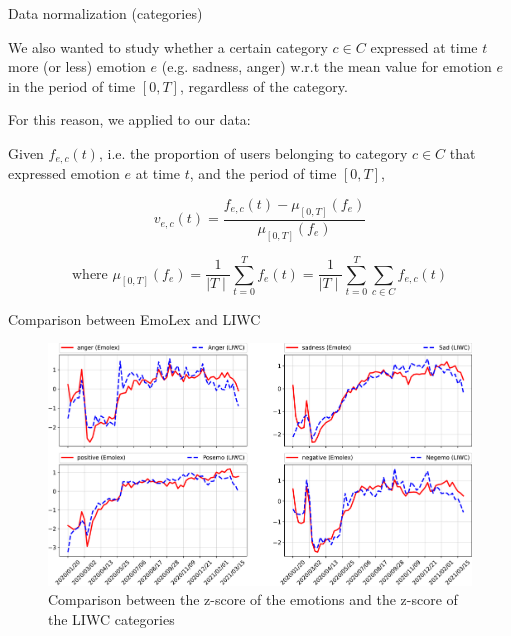 \documentclass[9pt,aspectratio=1610]{beamer}  %
\begin{document}
\begin{frame}{Data normalization (categories)}
	
	We also wanted to study whether a certain category \(c \in C\) expressed at time \(t\) more (or less) emotion \(e\) (e.g. sadness, anger) w.r.t the mean value for emotion \(e\) in the period of time \([0, T]\), regardless of the category.

    For this reason, we applied  to our data:
    	
    \begin{definition}[5]
    \label{def:categories-normalization}
    	Given \(f_{e, c}(t)\), i.e. the proportion of users belonging to category \(c \in C\) that expressed emotion \(e\) at time \(t\), and the period of time \([0,T]\),
    	
    	\[v_{e, c}(t) = \frac{f_{e, c}(t) - \mu_{[0,T]}(f_e)}{\mu_{[0,T]}(f_e)}\]
    	
    	\[\text{where } \mu_{[0,T]}(f_e) = \frac{1}{\mid T \mid} \sum_{t =0}^{T} f_e(t) = \frac{1}{\mid T \mid} \sum_{t =0}^{T} \sum_{c \in C} f_{e, c}(t)\] 
    \end{definition}
	
\end{frame}

\begin{frame}{Comparison between EmoLex and LIWC}

    \begin{figure}[H]
	    \centering
    	\includegraphics[scale=.30]{assets/img/en_emotions_and_liwc_categories_comparison.svg.pdf}
    	\caption{Comparison between the z-score of the emotions and the z-score of the LIWC categories}
    	\label{fig:en-emotions-liwc-comparison}
    \end{figure}
    
\end{frame}
\end{document}
